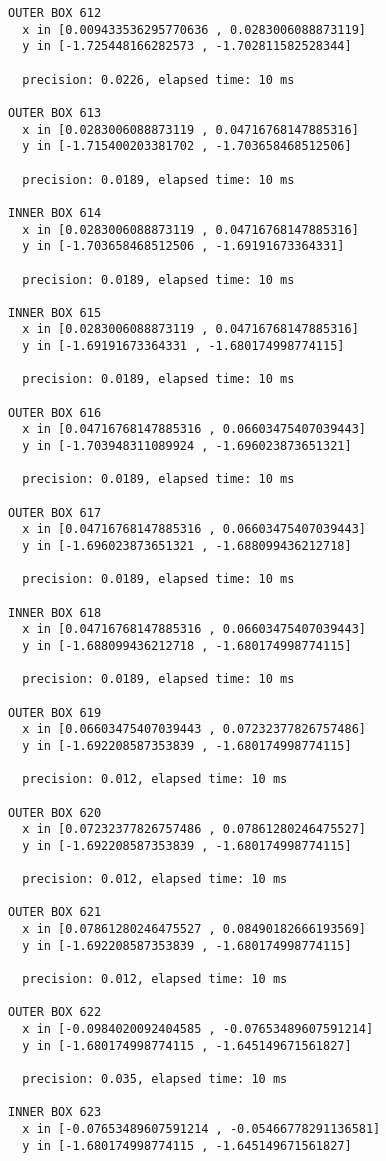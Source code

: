 \begin{verbatim}
OUTER BOX 612
  x in [0.009433536295770636 , 0.0283006088873119]
  y in [-1.725448166282573 , -1.702811582528344]

  precision: 0.0226, elapsed time: 10 ms

OUTER BOX 613
  x in [0.0283006088873119 , 0.04716768147885316]
  y in [-1.715400203381702 , -1.703658468512506]

  precision: 0.0189, elapsed time: 10 ms

INNER BOX 614
  x in [0.0283006088873119 , 0.04716768147885316]
  y in [-1.703658468512506 , -1.69191673364331]

  precision: 0.0189, elapsed time: 10 ms

INNER BOX 615
  x in [0.0283006088873119 , 0.04716768147885316]
  y in [-1.69191673364331 , -1.680174998774115]

  precision: 0.0189, elapsed time: 10 ms

OUTER BOX 616
  x in [0.04716768147885316 , 0.06603475407039443]
  y in [-1.703948311089924 , -1.696023873651321]

  precision: 0.0189, elapsed time: 10 ms

OUTER BOX 617
  x in [0.04716768147885316 , 0.06603475407039443]
  y in [-1.696023873651321 , -1.688099436212718]

  precision: 0.0189, elapsed time: 10 ms

INNER BOX 618
  x in [0.04716768147885316 , 0.06603475407039443]
  y in [-1.688099436212718 , -1.680174998774115]

  precision: 0.0189, elapsed time: 10 ms

OUTER BOX 619
  x in [0.06603475407039443 , 0.07232377826757486]
  y in [-1.692208587353839 , -1.680174998774115]

  precision: 0.012, elapsed time: 10 ms

OUTER BOX 620
  x in [0.07232377826757486 , 0.07861280246475527]
  y in [-1.692208587353839 , -1.680174998774115]

  precision: 0.012, elapsed time: 10 ms

OUTER BOX 621
  x in [0.07861280246475527 , 0.08490182666193569]
  y in [-1.692208587353839 , -1.680174998774115]

  precision: 0.012, elapsed time: 10 ms

OUTER BOX 622
  x in [-0.0984020092404585 , -0.07653489607591214]
  y in [-1.680174998774115 , -1.645149671561827]

  precision: 0.035, elapsed time: 10 ms

INNER BOX 623
  x in [-0.07653489607591214 , -0.05466778291136581]
  y in [-1.680174998774115 , -1.645149671561827]


\end{verbatim}
